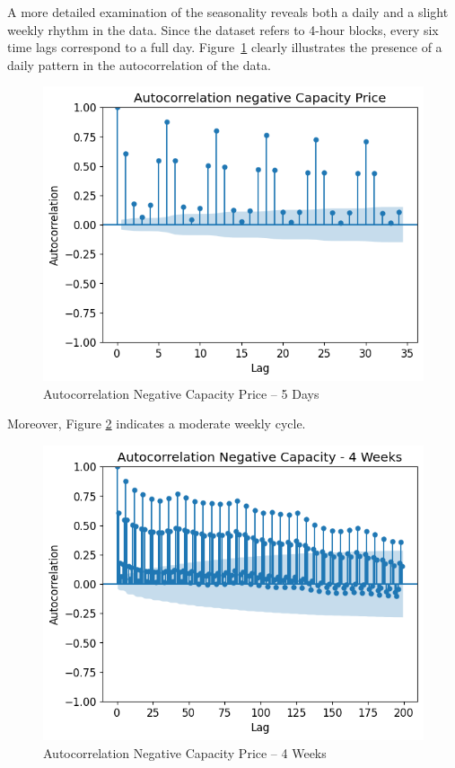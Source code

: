 A more detailed examination of the seasonality reveals both a daily
and a slight weekly rhythm in the data. Since the dataset refers to 4-hour blocks, every six time lags
correspond to a full day. Figure~\ref{fig:Autocorrelation Negative Capacity Price - 5 Days}
clearly illustrates the presence of a daily pattern in the autocorrelation of the data.

\begin{figure}[!h]
	\centering
	\includegraphics[width=0.7\linewidth]{pictures/Autocorrelation negative Capacity Price.png}
	\caption{Autocorrelation Negative Capacity Price – 5 Days}
	\label{fig:Autocorrelation Negative Capacity Price - 5 Days}
\end{figure}

Moreover, Figure \ref{fig:AutocorrNegCap4Weeks} indicates a moderate weekly cycle.

\begin{figure}[!h]
	\centering
	\includegraphics[width=0.7\linewidth]{pictures/Autocorrelation Negative Capacity - 4 Weeks.png}
	\caption{Autocorrelation Negative Capacity Price – 4 Weeks}
	\label{fig:AutocorrNegCap4Weeks}
\end{figure}

